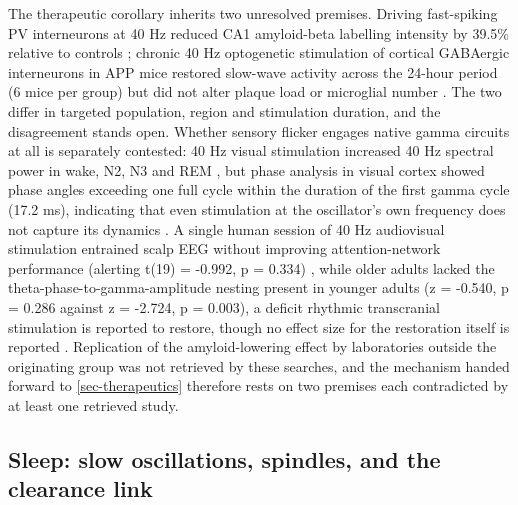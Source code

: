 \documentclass[11pt]{article}
\begin{document}
The therapeutic corollary inherits two unresolved premises. Driving fast-spiking PV interneurons at 40 Hz reduced CA1 amyloid-beta labelling intensity by 39.5\% relative to controls \citep{Iaccarino2016}; chronic 40 Hz optogenetic stimulation of cortical GABAergic interneurons in APP mice restored slow-wave activity across the 24-hour period (6 mice per group) but did not alter plaque load or microglial number \citep{Zhao2023}. The two differ in targeted population, region and stimulation duration, and the disagreement stands open. Whether sensory flicker engages native gamma circuits at all is separately contested: 40 Hz visual stimulation increased 40 Hz spectral power in wake, N2, N3 and REM \citep{Hainke2024}, but phase analysis in visual cortex showed phase angles exceeding one full cycle within the duration of the first gamma cycle (17.2 ms), indicating that even stimulation at the oscillator's own frequency does not capture its dynamics \citep{Duecker2021}. A single human session of 40 Hz audiovisual stimulation entrained scalp EEG without improving attention-network performance (alerting t(19) = -0.992, p = 0.334) \citep{Wu2025}, while older adults lacked the theta-phase-to-gamma-amplitude nesting present in younger adults (z = -0.540, p = 0.286 against z = -2.724, p = 0.003), a deficit rhythmic transcranial stimulation is reported to restore, though no effect size for the restoration itself is reported \citep{Reinhart2019}. Replication of the amyloid-lowering effect by laboratories outside the originating group was not retrieved by these searches, and the mechanism handed forward to \ref{sec-therapeutics} therefore rests on two premises each contradicted by at least one retrieved study.

\subsection{Sleep: slow oscillations, spindles, and the clearance link}
\label{sec-08-sleep}
\end{document}
